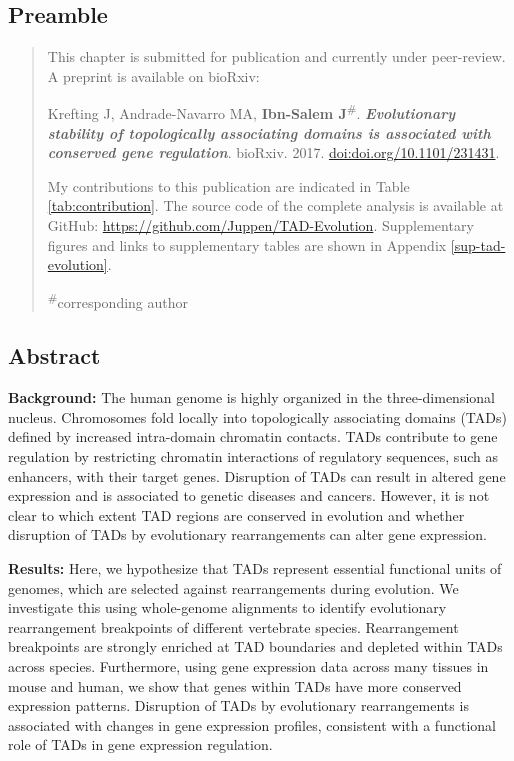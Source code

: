 \documentclass[a4paper,twoside=true,openright,parskip=full,chapterprefix=true,11pt,headings=normal,bibliography=totoc,listof=totoc,titlepage=on,captions=tableabove,draft=false]{scrreprt}
\theoremstyle{definition}
\theoremstyle{definition}
\theoremstyle{definition}
\theoremstyle{remark}
\begin{document}
\hypertarget{preamble-1}{%
\subsection*{Preamble}\label{preamble-1}}

\begin{quote}
This chapter is submitted for publication and currently under
peer-review. A preprint is available on bioRxiv:

Krefting J, Andrade-Navarro MA, \textbf{Ibn-Salem
J}\textsuperscript{\#}. \textbf{\emph{Evolutionary stability of
topologically associating domains is associated with conserved gene
regulation}}. bioRxiv. 2017.
\href{https://doi.org/10.1101/231431}{doi:doi.org/10.1101/231431}.

My contributions to this publication are indicated in Table
\ref{tab:contribution}. The source code of the complete analysis is
available at GitHub: \url{https://github.com/Juppen/TAD-Evolution}.
Supplementary figures and links to supplementary tables are shown in
Appendix \ref{sup-tad-evolution}.

\textsuperscript{\#}corresponding author
\end{quote}

\hypertarget{abstract-2}{%
\subsection*{Abstract}\label{abstract-2}}

\textbf{Background:} The human genome is highly organized in the
three-dimensional nucleus. Chromosomes fold locally into topologically
associating domains (TADs) defined by increased intra-domain chromatin
contacts. TADs contribute to gene regulation by restricting chromatin
interactions of regulatory sequences, such as enhancers, with their
target genes. Disruption of TADs can result in altered gene expression
and is associated to genetic diseases and cancers. However, it is not
clear to which extent TAD regions are conserved in evolution and whether
disruption of TADs by evolutionary rearrangements can alter gene
expression.

\textbf{Results:} Here, we hypothesize that TADs represent essential
functional units of genomes, which are selected against rearrangements
during evolution. We investigate this using whole-genome alignments to
identify evolutionary rearrangement breakpoints of different vertebrate
species. Rearrangement breakpoints are strongly enriched at TAD
boundaries and depleted within TADs across species. Furthermore, using
gene expression data across many tissues in mouse and human, we show
that genes within TADs have more conserved expression patterns.
Disruption of TADs by evolutionary rearrangements is associated with
changes in gene expression profiles, consistent with a functional role
of TADs in gene expression regulation.
\end{document}
